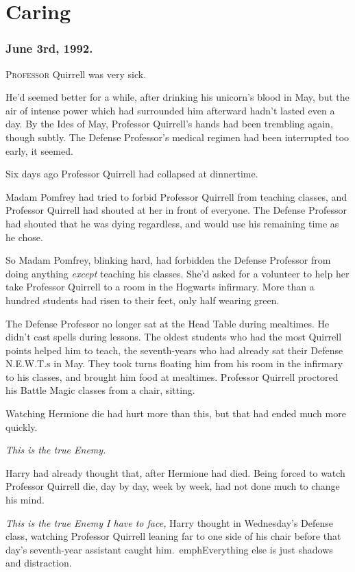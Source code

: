 \chapter{Caring}

\subsection{June 3rd, 1992.}

\lettrine{P}{rofessor} Quirrell was very sick.

\quad\quad
He'd seemed better for a while, after drinking his unicorn's blood in May, but 
the air of intense power which had surrounded him afterward hadn't lasted even 
a day. By the Ides of May, Professor Quirrell's hands had been trembling again, 
though subtly. The Defense Professor's medical regimen had been interrupted too 
early, it seemed.

Six days ago Professor Quirrell had collapsed at dinnertime.

Madam Pomfrey had tried to forbid Professor Quirrell from teaching classes, and 
Professor Quirrell had shouted at her in front of everyone. The Defense 
Professor had shouted that he was dying regardless, and would use his remaining 
time as he chose.

So Madam Pomfrey, blinking hard, had forbidden the Defense Professor from doing 
anything \emph{except} teaching his classes. She'd asked for a volunteer to 
help her take Professor Quirrell to a room in the Hogwarts infirmary. More than 
a hundred students had risen to their feet, only half wearing green.

The Defense Professor no longer sat at the Head Table during mealtimes. He 
didn't cast spells during lessons. The oldest students who had the most 
Quirrell points helped him to teach, the seventh-years who had already sat 
their Defense N.E.W.T.s in May. They took turns floating him from his room in 
the infirmary to his classes, and brought him food at mealtimes. Professor 
Quirrell proctored his Battle Magic classes from a chair, sitting.

Watching Hermione die had hurt more than this, but that had ended much more 
quickly.

\emph{This is the true Enemy.}

Harry had already thought that, after Hermione had died. Being forced to watch 
Professor Quirrell die, day by day, week by week, had not done much to change 
his mind.

\emph{This is the true Enemy I have to face,} Harry thought in Wednesday's 
Defense class, watching Professor Quirrell leaning far to one side of his chair 
before that day's seventh-year assistant caught him.\ emph{Everything else is 
just shadows and distraction.}

